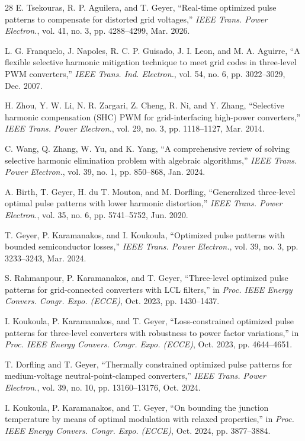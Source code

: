 \documentclass[conference]{IEEEtran}
\begin{document}
\begin{thebibliography}{28}
E. Tsekouras, R. P. Aguilera, and T. Geyer, ``Real-time optimized pulse
patterns to compensate for distorted grid voltages,'' \emph{IEEE Trans. Power
Electron.}, vol. 41, no. 3, pp. 4288--4299, Mar. 2026.

L. G. Franquelo, J. Napoles, R. C. P. Guisado, J. I. Leon, and M. A. Aguirre,
``A flexible selective harmonic mitigation technique to meet grid codes in
three-level PWM converters,'' \emph{IEEE Trans. Ind. Electron.}, vol. 54,
no. 6, pp. 3022--3029, Dec. 2007.

H. Zhou, Y. W. Li, N. R. Zargari, Z. Cheng, R. Ni, and Y. Zhang, ``Selective
harmonic compensation (SHC) PWM for grid-interfacing high-power converters,''
\emph{IEEE Trans. Power Electron.}, vol. 29, no. 3, pp. 1118--1127, Mar. 2014.

C. Wang, Q. Zhang, W. Yu, and K. Yang, ``A comprehensive review of solving
selective harmonic elimination problem with algebraic algorithms,'' \emph{IEEE
Trans. Power Electron.}, vol. 39, no. 1, pp. 850--868, Jan. 2024.

A. Birth, T. Geyer, H. du T. Mouton, and M. Dorfling, ``Generalized three-level
optimal pulse patterns with lower harmonic distortion,'' \emph{IEEE Trans. Power
Electron.}, vol. 35, no. 6, pp. 5741--5752, Jun. 2020.

T. Geyer, P. Karamanakos, and I. Koukoula, ``Optimized pulse patterns with
bounded semiconductor losses,'' \emph{IEEE Trans. Power Electron.}, vol. 39,
no. 3, pp. 3233--3243, Mar. 2024.

S. Rahmanpour, P. Karamanakos, and T. Geyer, ``Three-level optimized pulse
patterns for grid-connected converters with LCL filters,'' in \emph{Proc. IEEE
Energy Convers. Congr. Expo. (ECCE)}, Oct. 2023, pp. 1430--1437.

I. Koukoula, P. Karamanakos, and T. Geyer, ``Loss-constrained optimized pulse
patterns for three-level converters with robustness to power factor
variations,'' in \emph{Proc. IEEE Energy Convers. Congr. Expo. (ECCE)}, Oct.
2023, pp. 4644--4651.

T. Dorfling and T. Geyer, ``Thermally constrained optimized pulse patterns for
medium-voltage neutral-point-clamped converters,'' \emph{IEEE Trans. Power
Electron.}, vol. 39, no. 10, pp. 13160--13176, Oct. 2024.

I. Koukoula, P. Karamanakos, and T. Geyer, ``On bounding the junction temperature
by means of optimal modulation with relaxed properties,'' in \emph{Proc. IEEE
Energy Convers. Congr. Expo. (ECCE)}, Oct. 2024, pp. 3877--3884.


\end{thebibliography}
\end{document}
